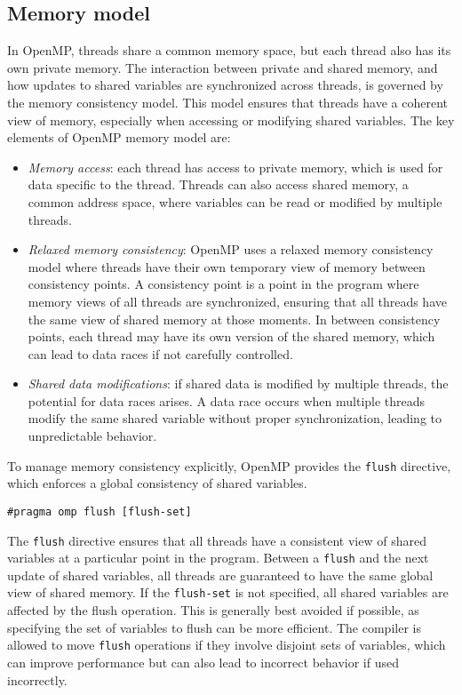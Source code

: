 \subsection{Memory model}
In OpenMP, threads share a common memory space, but each thread also has its own private memory. 
The interaction between private and shared memory, and how updates to shared variables are synchronized across threads, is governed by the memory consistency model.
This model ensures that threads have a coherent view of memory, especially when accessing or modifying shared variables.
The key elements of OpenMP memory model are: 
\begin{itemize}
    \item \textit{Memory access}: each thread has access to private memory, which is used for data specific to the thread.
        Threads can also access shared memory, a common address space, where variables can be read or modified by multiple threads.
    \item \textit{Relaxed memory consistency}: OpenMP uses a relaxed memory consistency model where threads have their own temporary view of memory between consistency points.
        A consistency point is a point in the program where memory views of all threads are synchronized, ensuring that all threads have the same view of shared memory at those moments.
        In between consistency points, each thread may have its own version of the shared memory, which can lead to data races if not carefully controlled.
    \item \textit{Shared data modifications}: if shared data is modified by multiple threads, the potential for data races arises. 
        A data race occurs when multiple threads modify the same shared variable without proper synchronization, leading to unpredictable behavior.
\end{itemize}
To manage memory consistency explicitly, OpenMP provides the \texttt{flush} directive, which enforces a global consistency of shared variables.
\begin{lstlisting}[style=C]
#pragma omp flush [flush-set]
\end{lstlisting}
The \texttt{flush} directive ensures that all threads have a consistent view of shared variables at a particular point in the program.
Between a \texttt{flush} and the next update of shared variables, all threads are guaranteed to have the same global view of shared memory.
If the \texttt{flush-set} is not specified, all shared variables are affected by the flush operation. 
This is generally best avoided if possible, as specifying the set of variables to flush can be more efficient.
The compiler is allowed to move \texttt{flush} operations if they involve disjoint sets of variables, which can improve performance but can also lead to incorrect behavior if used incorrectly.

